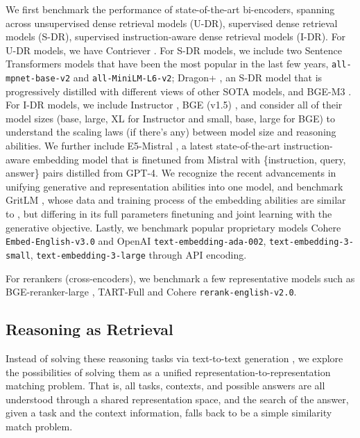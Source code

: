\documentclass{article} %
\begin{document}
We first benchmark the performance of state-of-the-art bi-encoders, spanning across unsupervised dense retrieval models (U-DR), supervised dense retrieval models (S-DR), supervised instruction-aware dense retrieval models (I-DR). For U-DR models, we have Contriever \citep{izacard2022unsupervised}. For S-DR models, we include two Sentence Transformers \citep{reimers2019sentence} models that have been the most popular in the last few years, \texttt{all-mpnet-base-v2} and \texttt{all-MiniLM-L6-v2}; Dragon+ \citep{lin2023train}, an S-DR model that is progressively distilled with different views of other SOTA models, and BGE-M3 \citep{chen2024bge}. For I-DR models, we include Instructor \citep{su2022one}, BGE (v1.5) \citep{xiao2023c}, and consider all of their model sizes (base, large, XL for Instructor and small, base, large for BGE) to understand the scaling laws (if there's any) between model size and reasoning abilities. We further include E5-Mistral \citep{wang2023improving}, a latest state-of-the-art instruction-aware embedding model that is finetuned from Mistral \citep{jiang2023mistral} with \{instruction, query, answer\} pairs distilled from GPT-4. We recognize the recent advancements in unifying generative and representation abilities into one model, and benchmark GritLM \citep{muennighoff2024generative}, whose data and training process of the embedding abilities are similar to \cite{jiang2023mistral}, but differing in its full parameters finetuning and joint learning with the generative objective. Lastly, we benchmark popular proprietary models Cohere \texttt{Embed-English-v3.0} and OpenAI \texttt{text-embedding-ada-002}, \texttt{text-embedding-3-small}, \texttt{text-embedding-3-large} through API encoding.

For rerankers (cross-encoders), we benchmark a few representative models such as BGE-reranker-large \citep{xiao2023c}, TART-Full \citep{asai2022task} and Cohere \texttt{rerank-english-v2.0}.

\subsection{Reasoning as Retrieval}


Instead of solving these reasoning tasks via text-to-text generation \citep{raffel2020exploring,lourie2021unicorn}, we explore the possibilities of solving them as a unified representation-to-representation matching problem. That is, all tasks, contexts, and possible answers are all understood through a shared representation space, and the search of the answer, given a task and the context information, falls back to be a simple similarity match problem.
\end{document}
